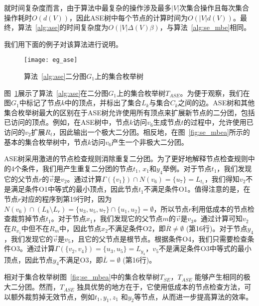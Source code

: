 就时间复杂度而言，由于算法中最复杂的操作涉及最多$|V|$次集合操作且每次集合操作耗时$O(d(V))$，因此ASE树中每个节点的计算时间为$O(|V|d(V))$。最终，算法~\ref{alg:ase}的时间复杂度为$O(|V|\Delta(V)\beta)$，与算法~\ref{alg:se_mbe}相同。

我们用下面的例子对该算法进行说明。

\begin{figure} [ht]
  \vspace{0.1 in}
  \centering
  \texttt{[image: eg\_ase]}
  \vspace{0.1 in}
  \caption{算法~\ref{alg:ase}二分图$G_1$上的集合枚举树}
  \label{fig:ase}
\end{figure}

\begin{example}
  \label{example:ase}
  图~\ref{fig:ase}展示了算法~\ref{alg:ase}在二分图$G_1$上的集合枚举树$T_{ASE}$。为便于观察，我们在图$G_1$中标记了节点$k$中的顶点，并标出了集合$L_k$与集合$C_k$之间的边。ASE树和其他集合枚举树最大的区别在于ASE树允许使用所有顶点来扩展新节点的二分团，包括已访问的顶点。例如，在ASE树中，节点$k$访问$v_6$生成节点$t$的过程中，允许使用已访问的$v_2$扩展$R_t$，因此输出一个极大二分团。相反地，在图~\ref{fig:se_mbea}所示的基本的集合枚举树中，节点$k$访问$v_6$产生一个非极大二分团。

  ASE树采用激进的节点检查规则消除重复二分团。为了更好地解释节点检查规则中的4个条件，我们用产生重复二分团的节点$t_1$, $x_1$和$y_4$举例。对于节点$t_1$，我们发现它的父节点$r$的$\vec{v}$是$v_2$。通过计算$\Gamma(\{v_1\})\cap N(v_6)=\{u_7\} = L_{t_1}$，我们得知$v_2$不是满足条件O1中等式的最小顶点，因此节点$t_1$不满足条件O1。值得注意的是，在节点$r$对应的程序到第19行时，因为$N(v_6) \cap (L_k \setminus L_r) = \{u_3, u_5, u_7\} \cap \{u_1, u_2\} = \emptyset$，所以节点$r$利用低成本的节点检查裁剪掉节点$t_1$。对于节点$x_1$，我们发现它的父节点$m$的$\vec{v}$是$v_3$。通过计算可知$v_2$在$R_{x_1}$中但不在$R_{m}$中，因此节点$x_2$不满足条件O2，即$\overline{R}\neq\emptyset$ (第16行)。对于节点$y_4$，我们发现它的$\vec{v}$是$v_5$，且它的父节点是根节点。根据条件O4，我们只需要检查条件O3。通过计算$\Gamma(\{v_2, v_4\}) = \{u_3, u_5\} = L_{y_4}$，$v_5$不是满足条件O3中等式的最小顶点，因此节点$y_4$不满足O3，即$\overline{L}=\emptyset$ (第16行)。
  
  相对于集合枚举树图~\ref{fig:se_mbea}中的集合枚举树$T_{SE}$，$T_{ASE}$ 能够产生相同的极大二分团。然而，$T_{ASE}$ 独具优势的地方在于，它使用低成本的节点检查方法，可以额外裁剪掉无效节点，例如$t_1, y_1, z_1$ 和$y_2$等节点，从而进一步提高算法的效率。



\end{example}
